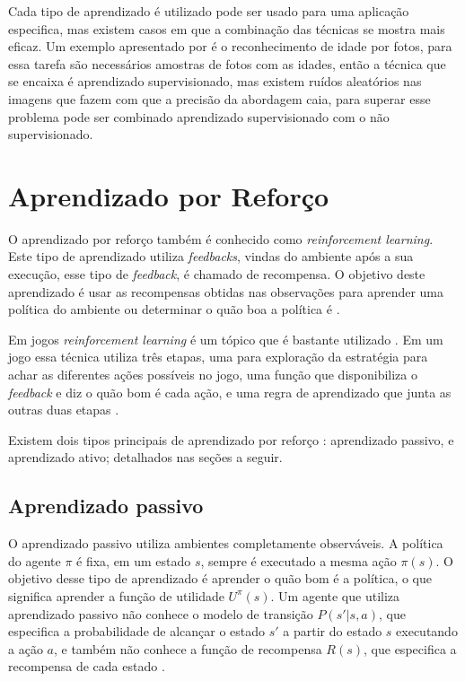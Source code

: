Cada tipo de aprendizado é utilizado pode ser usado para uma aplicação especifica, mas existem casos em que a combinação das técnicas se mostra mais eficaz. 
Um exemplo apresentado por \cite{intelligence2003modern} é o reconhecimento de idade por fotos, para essa tarefa são necessários amostras de fotos com as idades, então a técnica que se encaixa é aprendizado supervisionado, mas existem ruídos aleatórios nas imagens que fazem com que a precisão da abordagem caia, para superar esse problema pode ser combinado aprendizado supervisionado com o não supervisionado.

\section{Aprendizado por Reforço}

O aprendizado por reforço também é conhecido como \textit{reinforcement learning}. Este tipo de aprendizado utiliza \textit{feedbacks}, vindas do ambiente após a sua execução, esse tipo de \textit{feedback}, é chamado de recompensa. O objetivo deste aprendizado é usar as recompensas obtidas nas observações para aprender uma política do ambiente ou determinar o quão boa a política é \cite{intelligence2003modern}. 

Em jogos \textit{reinforcement learning} é um tópico que é bastante utilizado \cite{millington2009artificial}. Em um jogo essa técnica utiliza três etapas, uma para exploração da estratégia para achar as diferentes ações possíveis no jogo, uma função que disponibiliza o \textit{feedback} e diz o quão bom é cada ação, e uma regra de aprendizado que junta as outras duas etapas \cite{millington2009artificial}.

Existem dois tipos principais de aprendizado por reforço \cite{intelligence2003modern}: aprendizado passivo, e aprendizado ativo; detalhados nas seções a seguir. 

\subsection{Aprendizado passivo} 

O aprendizado passivo utiliza ambientes completamente observáveis. A política do agente $\pi$ é fixa, em um estado $s$, sempre é executado a mesma ação $\pi(s)$. O objetivo desse tipo de aprendizado é aprender o quão bom é a política, o que significa aprender a função de utilidade $U^{\pi}(s)$. Um agente que utiliza aprendizado passivo não conhece o modelo de transição $P(s' | s, a)$, que especifica a probabilidade de alcançar o estado $s'$ a partir do estado $s$ executando a ação $a$, e também não conhece a função de recompensa $R(s)$, que especifica a recompensa de cada estado \cite{intelligence2003modern}. 


